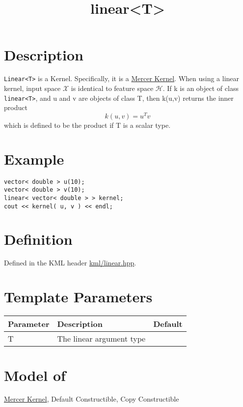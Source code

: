 \documentclass{article}
\begin{document}
\title{linear<T>}
\maketitle

\section*{Description}

\texttt{Linear<T>} is a Kernel. Specifically, it is a \href{\kmlroot/mercer_kernel.html}{Mercer Kernel}.
When using a linear kernel, input space $\mathcal{X}$ is identical to feature space $\mathcal{H}$.
If k is an object of class \texttt{linear<T>}, and u and v are objects of class T, then k(u,v) returns the inner product 
%
$$k(u,v) = u^T v $$
%
which is defined to be the product if T is a scalar type. 


\section*{Example}

\highlightcpp{}
\begin{verbatim}
vector< double > u(10);
vector< double > v(10);
linear< vector< double > > kernel;
cout << kernel( u, v ) << endl;
\end{verbatim}


\section*{Definition}

Defined in the KML header \href{\kmlsvnroot/kml/linear.hpp}{kml/linear.hpp}.


\section*{Template Parameters}

\begin{tabular}{lll}
\textbf{Parameter} & \textbf{Description} & \textbf{Default} \\ 
\hline
T & The linear argument type \\ 
\end{tabular}


\section*{Model of}

\href{\kmlroot/mercer_kernel.html}{Mercer Kernel}, 
Default Constructible, Copy Constructible
\end{document}
